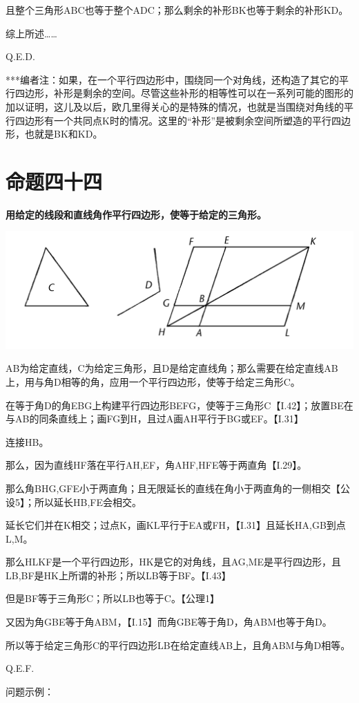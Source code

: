 \documentclass[
]{book}
\begin{document}
且整个三角形ABC也等于整个ADC；那么剩余的补形BK也等于剩余的补形KD。

综上所述\ldots\ldots{}

Q.E.D.

***编者注：如果，在一个平行四边形中，围绕同一个对角线，还构造了其它的平行四边形，补形是剩余的空间。尽管这些补形的相等性可以在一系列可能的图形的加以证明，这儿及以后，欧几里得关心的是特殊的情况，也就是当围绕对角线的平行四边形有一个共同点K时的情况。这里的``补形''是被剩余空间所塑造的平行四边形，也就是BK和KD。

\hypertarget{ux547dux9898ux56dbux5341ux56db}{%
\section{命题四十四}\label{ux547dux9898ux56dbux5341ux56db}}

\textbf{用给定的线段和直线角作平行四边形，使等于给定的三角形。}

\includegraphics[width=0.5\linewidth]{./image/img546}

AB为给定直线，C为给定三角形，且D是给定直线角；那么需要在给定直线AB上，用与角D相等的角，应用一个平行四边形，使等于给定三角形C。

在等于角D的角EBG上构建平行四边形BEFG，使等于三角形C【I.42】；放置BE在与AB的同条直线上；画FG到H，且过A画AH平行于BG或EF。【I.31】

连接HB。

那么，因为直线HF落在平行AH,EF，角AHF,HFE等于两直角【I.29】。

那么角BHG,GFE小于两直角；且无限延长的直线在角小于两直角的一侧相交【公设5】；所以延长HB,FE会相交。

延长它们并在K相交；过点K，画KL平行于EA或FH，【I.31】且延长HA,GB到点L,M。

那么HLKF是一个平行四边形，HK是它的对角线，且AG,ME是平行四边形，且LB,BF是HK上所谓的补形；所以LB等于BF。【I.43】

但是BF等于三角形C；所以LB也等于C。【公理1】

又因为角GBE等于角ABM，【I.15】而角GBE等于角D，角ABM也等于角D。

所以等于给定三角形C的平行四边形LB在给定直线AB上，且角ABM与角D相等。

Q.E.F.

问题示例：
\end{document}
